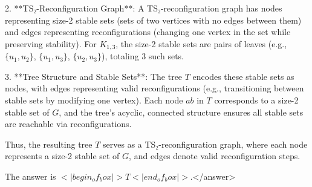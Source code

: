 2. **TS₂-Reconfiguration Graph**:  
   A TS₂-reconfiguration graph has nodes representing size-2 stable sets (sets of two vertices with no edges between them) and edges representing reconfigurations (changing one vertex in the set while preserving stability). For \( K_{1,3} \), the size-2 stable sets are pairs of leaves (e.g., \( \{u_1, u_2\} \), \( \{u_1, u_3\} \), \( \{u_2, u_3\} \)), totaling 3 such sets.  

3. **Tree Structure and Stable Sets**:  
   The tree \( T \) encodes these stable sets as nodes, with edges representing valid reconfigurations (e.g., transitioning between stable sets by modifying one vertex). Each node \( ab \) in \( T \) corresponds to a size-2 stable set of \( G \), and the tree’s acyclic, connected structure ensures all stable sets are reachable via reconfigurations.  

Thus, the resulting tree \( T \) serves as a TS₂-reconfiguration graph, where each node represents a size-2 stable set of \( G \), and edges denote valid reconfiguration steps.  

The answer is \(<|begin_of_box|>T<|end_of_box|>\).</answer>